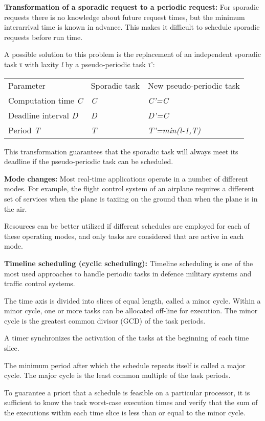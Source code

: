 \textbf{Transformation of a sporadic request to a periodic request:} For
sporadic requests there is no knowledge about future request times, but
the minimum interarrival time is known in advance. This makes it
difficult to schedule sporadic requests before run time.

A possible solution to this problem is the replacement of an independent
sporadic task τ with laxity \emph{l} by a pseudo-periodic task τ':

\begin{longtable}[c]{@{}lll@{}}
\toprule
Parameter & Sporadic task & New pseudo-periodic task\tabularnewline
Computation time \emph{C} & \emph{C} & \emph{C'=C}\tabularnewline
Deadline interval \emph{D} & \emph{D} & \emph{D'=C}\tabularnewline
Period \emph{T} & \emph{T} & \emph{T'=min(l-1,T)}\tabularnewline
\bottomrule
\end{longtable}

This transformation guarantees that the sporadic task will always meet
its deadline if the pseudo-periodic task can be scheduled.

\textbf{Mode changes:} Most real-time applications operate in a number
of different modes. For example, the flight control system of an
airplane requires a different set of services when the plane is taxiing
on the ground than when the plane is in the air.

Resources can be better utilized if different schedules are employed for
each of these operating modes, and only tasks are considered that are
active in each mode.

\textbf{Timeline scheduling (cyclic scheduling):} Timeline scheduling is
one of the most used approaches to handle periodic tasks in defence
military systems and traffic control systems.

The time axis is divided into slices of equal length, called a minor
cycle. Within a minor cycle, one or more tasks can be allocated off-line
for execution. The minor cycle is the greatest common divisor (GCD) of
the task periods.

A timer synchronizes the activation of the tasks at the beginning of
each time slice.

The minimum period after which the schedule repeats itself is called a
major cycle. The major cycle is the least common multiple of the task
periods.

To guarantee a priori that a schedule is feasible on a particular
processor, it is sufficient to know the task worst-case execution times
and verify that the sum of the executions within each time slice is less
than or equal to the minor cycle.

